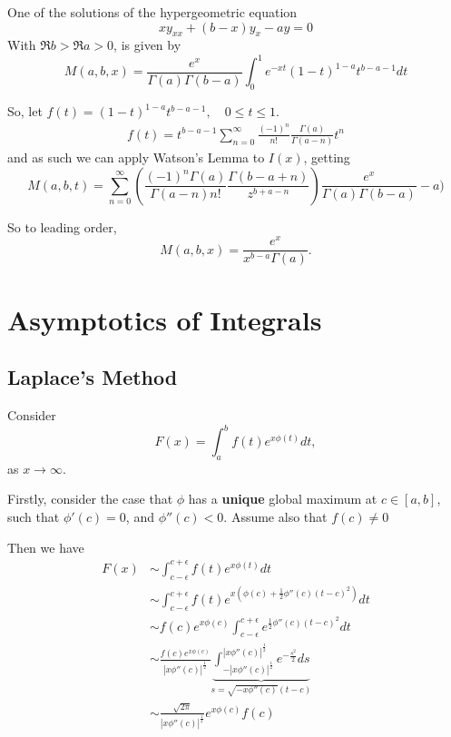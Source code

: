 \documentclass[a4paper]{article}
\begin{document}
\begin{eg}
	One of the solutions of the hypergeometric equation
	\[
		xy_{x x} + (b-x) y_x - ay = 0
	\]
	With $\Re b > \Re a > 0$, is given by
	 \[
		 M(a,b,x) = \frac{e^{x}}{\Gamma(a)\Gamma(b-a)} \int_{0}^{1}  e^{-xt} (1-t)^{1-a} t^{b-a-1} dt
	\]

	So, let $f(t) = (1-t)^{1-a}t^{b-a-1}, \quad 0\le t\le 1$.
	\begin{align*}
		f(t) = t^{b-a-1} \sum_{n=0}^{\infty} \frac{(-1)^{n}}{n!} \frac{\Gamma(a)}{\Gamma(a-n)} t^{n}
	\end{align*}
	and as such we can apply Watson's Lemma to $I(x)$, getting 
	\[
		M(a,b,t) = \sum_{n=0}^{\infty} \left( \frac{(-1)^{n} \Gamma(a)}{\Gamma(a-n) n!} \frac{\Gamma(b-a+n)}{z^{b+a-n}} \right) \frac{e^{x}}{\Gamma(a)\Gamma(b-a)}
-a)
\]

So to leading order, \[
	M(a,b,x) = \frac{e^{x}}{x^{b-a} \Gamma(a)}
.\] 
\end{eg}

\section{Asymptotics of Integrals}

\subsection{Laplace's Method}

Consider
\[
	F(x) = \int_a^{b} f(t) e^{x\phi(t)} dt
,\] as $x\to \infty$. 

Firstly, consider the case that $\phi$ has a \textbf{unique} global maximum at $c\in [a,b]$, such that $\phi'(c) = 0$, and  $\phi''(c) < 0$. Assume also that $f(c) \neq 0$

Then we have  
\begin{align*}
	F(x) &\sim \int_{c-\epsilon}^{c+\epsilon} f(t) e^{x\phi(t)}dt \\
	&\sim \int_{c-\epsilon}^{c+\epsilon} f(t) e^{x (\phi(c) + \frac{1}{2} \phi''(c) (t-c)^2)} dt \\
	&\sim f(c)e^{x\phi(c)} \int_{c-\epsilon}^{c+\epsilon}e^{\frac{1}{2}\phi''(c)(t-c)^2}dt \\
	&\sim \frac{f(c) e^{x\phi(c)}}{|x\phi''(c)|^{\frac{1}{2}}} \underbrace{\int_{-|x\phi''(c)|^{\frac{1}{2}}}^{|x\phi''(c)|^{\frac{1}{2}}} e^{-\frac{s^2}{2}}ds}_{s= \sqrt{-x\phi''(c)}(t-c)}\\
	&\sim \frac{\sqrt{2\pi} }{|x\phi''(c)|^{\frac{1}{2}}} e^{x\phi(c)}f(c)
\end{align*}
\end{document}

